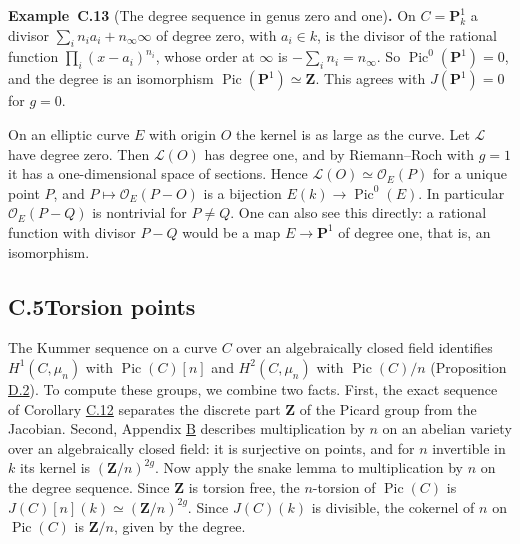 \documentclass[11pt]{article}
\newenvironment{bpstatement}[2]{\par\addvspace{0.6\baselineskip}\noindent\textbf{#1}#2\textbf{.}\enspace\ignorespaces}
  {\par\addvspace{0.4\baselineskip}}
\begin{document}
\label{bp159}%
\begin{bpstatement}{Example~C.13}{ (The degree sequence in genus zero and one)}
On \(C=\mathbf P^1_k\) a divisor \(\sum_in_ia_i+n_\infty\infty\) of degree zero, with \(a_i\in k\), is the divisor of the rational function \(\prod_i(x-a_i)^{n_i}\), whose order at \(\infty\) is \(-\sum_in_i=n_\infty\). So \(\operatorname{Pic}^0(\mathbf P^1)=0\), and the degree is an isomorphism \(\operatorname{Pic}(\mathbf P^1)\simeq\mathbf Z\). This agrees with \(J(\mathbf P^1)=0\) for \(g=0\).

On an elliptic curve \(E\) with origin \(O\) the kernel is as large as the curve. Let \(\mathcal L\) have degree zero. Then \(\mathcal L(O)\) has degree one, and by Riemann–Roch with \(g=1\) it has a one-dimensional space of sections. Hence \(\mathcal L(O)\simeq\mathcal O_E(P)\) for a unique point \(P\), and \(P\mapsto\mathcal O_E(P-O)\) is a bijection \(E(k)\to\operatorname{Pic}^0(E)\). In particular \(\mathcal O_E(P-Q)\) is nontrivial for \(P\neq Q\). One can also see this directly: a rational function with divisor \(P-Q\) would be a map \(E\to\mathbf P^1\) of degree one, that is, an isomorphism.
\end{bpstatement}


\subsection*{\texorpdfstring{C.5\quad Torsion points}{C.5 Torsion points}}
\label{bp160}%
\label{bp161}%
The Kummer sequence on a curve \(C\) over an algebraically closed field identifies \(H^1(C,\mu_n)\) with \(\operatorname{Pic}(C)[n]\) and \(H^2(C,\mu_n)\) with \(\operatorname{Pic}(C)/n\) (Proposition \hyperref[bp179]{D.2}). To compute these groups, we combine two facts. First, the exact sequence of Corollary \hyperref[bp157]{C.12} separates the discrete part \(\mathbf Z\) of the Picard group from the Jacobian. Second, Appendix \hyperref[bp75]{B} describes multiplication by \(n\) on an abelian variety over an algebraically closed field: it is surjective on points, and for \(n\) invertible in \(k\) its kernel is \((\mathbf Z/n)^{2g}\). Now apply the snake lemma to multiplication by \(n\) on the degree sequence. Since \(\mathbf Z\) is torsion free, the \(n\)-torsion of \(\operatorname{Pic}(C)\) is \(J(C)[n](k)\simeq(\mathbf Z/n)^{2g}\). Since \(J(C)(k)\) is divisible, the cokernel of \(n\) on \(\operatorname{Pic}(C)\) is \(\mathbf Z/n\), given by the degree.
\end{document}
